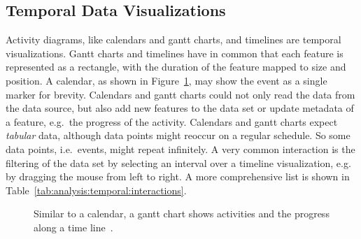 \subsection{Temporal Data Visualizations}

Activity diagrams, like calendars and gantt charts, and timelines are temporal visualizations.
Gantt charts and timelines have in common that each feature is represented as a rectangle, with the duration of the feature mapped to size and position.
A calendar, as shown in Figure~\ref{fig:analysis:temporal}, may show the event as a single marker for brevity.
Calendars and gantt charts could not only read the data from the data source, but also add new features to the data set or update metadata of a feature, e.g.\ the progress of the activity.
Calendars and gantt charts expect \emph{tabular} data, although data points might reoccur on a regular schedule.
So some data points, i.e.\ events, might repeat infinitely.
A very common interaction is the filtering of the data set by selecting an interval over a timeline visualization, e.g. by dragging the mouse from left to right.
A more comprehensive list is shown in Table~\ref{tab:analysis:temporal:interactions}.

\begin{figure}
  \centering
  \qquad
  \caption{Similar to a calendar, a gantt chart shows activities and the progress along a time line~\parencite{VisualizationCatalogue2017}.}%
  \label{fig:analysis:temporal}
\end{figure}

